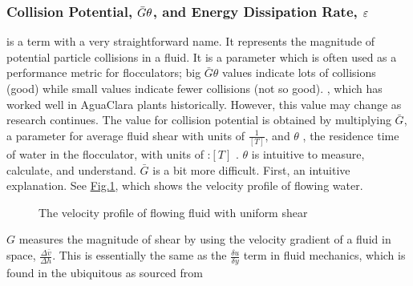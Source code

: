 \documentclass[letterpaper,10pt,english]{sphinxmanual}
\begin{document}
\subsubsection{Collision Potential, \protect\(\bar G \theta\protect\), and Energy Dissipation Rate, \protect\(\varepsilon\protect\)}
\label{\detokenize{Flocculation/Floc_Design:collision-potential-and-energy-dissipation-rate}}
 is a term with a very straightforward name. It represents the magnitude of potential particle collisions in a fluid. It is a  parameter which is often used as a performance metric for flocculators; big \(\bar G \theta\) values indicate lots of collisions (good) while small values indicate fewer collisions (not so good). , which has worked well in AguaClara plants historically. However, this value may change as research continues. The value for collision potential is obtained by multiplying \(\bar G\), a parameter for average fluid shear with units of \(\frac{1}{[T]}\), and \(\theta\) , the residence time of water in the flocculator, with units of :\([T]\) . \(\theta\) is intuitive to measure, calculate, and understand. \(\bar G\) is a bit more difficult. First, an intuitive explanation. See \hyperref[\detokenize{Flocculation/Floc_Design:figure-g-velocity-profile}]{Fig.\@ \ref{\detokenize{Flocculation/Floc_Design:figure-g-velocity-profile}}}, which shows the velocity profile of flowing water.

\begin{figure}[htbp]
\centering
\capstart

\noindent{}
\caption{The velocity profile of flowing fluid with uniform shear}\label{\detokenize{Flocculation/Floc_Design:id2}}\label{\detokenize{Flocculation/Floc_Design:figure-g-velocity-profile}}\end{figure}

\(G\) measures the magnitude of shear by using the velocity gradient of a fluid in space, \(\frac{\Delta \bar v}{\Delta h}\). This is essentially the same as the \(\frac{\delta u}{\delta y}\) term in fluid mechanics, which is found in the ubiquitous  as sourced from 
\end{document}
